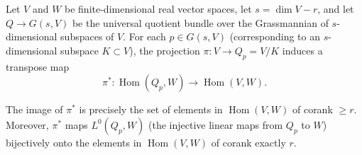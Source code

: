 Let $V$ and $W$ be finite-dimensional real vector spaces, let $s = \dim V - r$, and let $Q \to G(s, V)$ be the universal quotient bundle over the Grassmannian of $s$-dimensional subspaces of $V$. For each $p \in G(s, V)$ (corresponding to an $s$-dimensional subspace $K \subset V$), the projection $\pi: V \to Q_p = V/K$ induces a transpose map
$$
\pi^*: \operatorname{Hom}(Q_p, W) \to \operatorname{Hom}(V, W).
$$

The image of $\pi^*$ is precisely the set of elements in $\operatorname{Hom}(V, W)$ of corank $\geq r$. Moreover, $\pi^*$ maps $L^0(Q_p, W)$ (the injective linear maps from $Q_p$ to $W$) bijectively onto the elements in $\operatorname{Hom}(V, W)$ of corank exactly $r$.
